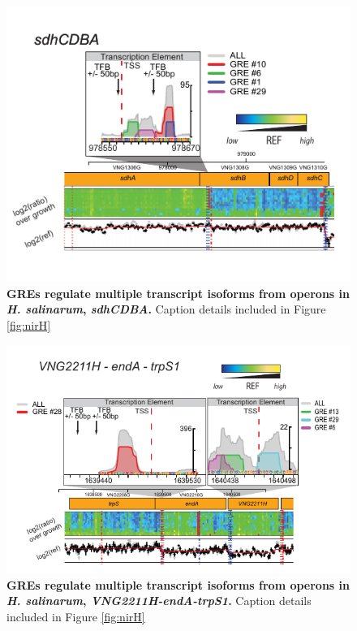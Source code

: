 \begin{figure}[h!]
\centering
\includegraphics[width=0.6\linewidth]{figures/sdh.pdf}
\caption[GREs regulate multiple transcript isoforms from operons in {\it H. salinarum}, \textit{sdhCDBA}.]{\textbf{GREs regulate multiple transcript isoforms from operons in {\it H. salinarum}, \textit{sdhCDBA}.} Caption details included in Figure \ref{fig:nirH}}
\label{fig:sdh}
\end{figure}

\begin{figure}[h!]
\centering
\includegraphics[width=0.6\linewidth]{figures/vng2211h.pdf}
\caption[GREs regulate multiple transcript isoforms from operons in {\it H. salinarum}, \textit{VNG2211H-endA-trpS1}.]{\textbf{GREs regulate multiple transcript isoforms from operons in {\it H. salinarum}, \textit{VNG2211H-endA-trpS1}.} Caption details included in Figure \ref{fig:nirH}}
\label{fig:vng2211h}
\end{figure}


